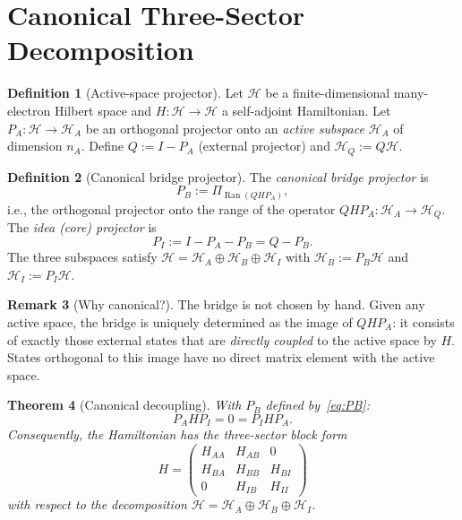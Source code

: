 \documentclass[12pt]{article}
\theoremstyle{plain}
\newtheorem{theorem}{Theorem}[section]
\theoremstyle{definition}
\newtheorem{definition}[theorem]{Definition}
\newtheorem{remark}[theorem]{Remark}
\numberwithin{equation}{section}
\DeclareMathOperator{\Ran}{Ran}
\begin{document}
\section{Canonical Three-Sector Decomposition}\label{sec:canonical}

\begin{definition}[Active-space projector]\label{def:active}
Let $\mathcal{H}$ be a finite-dimensional many-electron Hilbert
space and $H:\mathcal{H}\to\mathcal{H}$ a self-adjoint Hamiltonian.
Let $P_A:\mathcal{H}\to\mathcal{H}_A$ be an orthogonal projector
onto an \emph{active subspace} $\mathcal{H}_A$ of dimension $n_A$.
Define $Q:=I-P_A$ (external projector) and
$\mathcal{H}_Q:=Q\mathcal{H}$.
\end{definition}

\begin{definition}[Canonical bridge projector]\label{def:bridge}
The \emph{canonical bridge projector} is
\begin{equation}\label{eq:PB}
\boxed{P_B := \Pi_{\Ran(QHP_A)},}
\end{equation}
i.e., the orthogonal projector onto the range of the operator
$QHP_A:\mathcal{H}_A\to\mathcal{H}_Q$.  The \emph{idea (core)
projector} is
\begin{equation}
P_I := I - P_A - P_B = Q - P_B.
\end{equation}
The three subspaces satisfy
$\mathcal{H}=\mathcal{H}_A\oplus\mathcal{H}_B\oplus\mathcal{H}_I$
with $\mathcal{H}_B:=P_B\mathcal{H}$ and
$\mathcal{H}_I:=P_I\mathcal{H}$.
\end{definition}

\begin{remark}[Why canonical?]
The bridge is not chosen by hand.  Given any active space, the
bridge is uniquely determined as the image of $QHP_A$: it consists
of exactly those external states that are \emph{directly coupled}
to the active space by $H$.  States orthogonal to this image have
no direct matrix element with the active space.
\end{remark}

\begin{theorem}[Canonical decoupling]\label{thm:decoupling}
With $P_B$ defined by~\eqref{eq:PB}:
\begin{equation}\label{eq:decoupling}
\boxed{P_A H P_I = 0 = P_I H P_A.}
\end{equation}
Consequently, the Hamiltonian has the three-sector block form
\begin{equation}\label{eq:blockH}
H = \begin{pmatrix}
H_{AA} & H_{AB} & 0\\
H_{BA} & H_{BB} & H_{BI}\\
0 & H_{IB} & H_{II}
\end{pmatrix}
\end{equation}
with respect to the decomposition
$\mathcal{H}=\mathcal{H}_A\oplus\mathcal{H}_B\oplus\mathcal{H}_I$.
\end{theorem}
\end{document}
